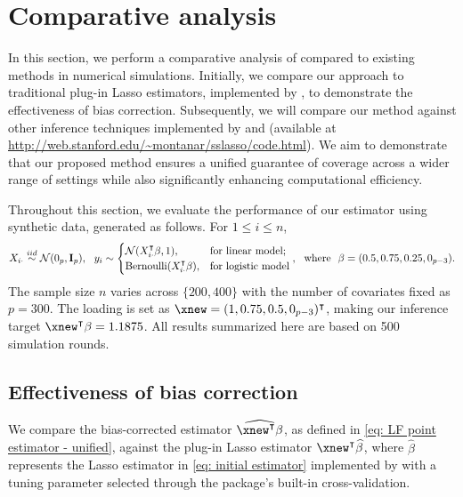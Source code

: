 \section{Comparative analysis}
\label{sec: compare}
In this section, we perform a comparative analysis of  compared to existing methods in numerical simulations. Initially, we compare our approach to traditional plug-in Lasso estimators, implemented by , to demonstrate the effectiveness of bias correction. 
Subsequently, we will compare our method against other inference techniques implemented by  and  (available at \url{http://web.stanford.edu/~montanar/sslasso/code.html}). We aim to demonstrate that our proposed method ensures a unified guarantee of coverage across a wider range of settings while also significantly enhancing computational efficiency.

Throughout this section, we evaluate the performance of our  estimator using synthetic data, generated as follows. For $1\leq i\leq n$,
\[
X_{i\cdot}\stackrel{iid}{\sim}\mathcal{N}(0_p, \mathbf{I}_p),~~y_i \sim \begin{cases}
    \mathcal{N}(X_{i\cdot}^\intercal \beta, 1), & \textrm{for linear model};\\
    {\rm Bernoulli}(X_{i\cdot}^\intercal \beta), &\textrm{for logistic model}
\end{cases},~~\textrm{where }~ \beta=(0.5, 0.75, 0.25, 0_{p-3}).
\]
The sample size $n$ varies across $\{200,400\}$ with the number of covariates fixed as $p=300$. The loading is set as $\xnew=(1,0.75,0.5,0_{p-3})^\intercal$, making our inference target $\xnew^\intercal\beta = 1.1875$. All results summarized here are based on 500 simulation rounds.

\subsection{Effectiveness of bias correction}
We compare the bias-corrected estimator $\widehat{\xnew^\intercal \beta}$, as defined in \eqref{eq: LF point estimator - unified}, against the plug-in Lasso estimator $\xnew^\intercal \widehat{\beta}$, where $\widehat{\beta}$ represents the Lasso estimator in \eqref{eq: initial estimator} implemented by  with a tuning parameter selected through the package's built-in cross-validation.%

